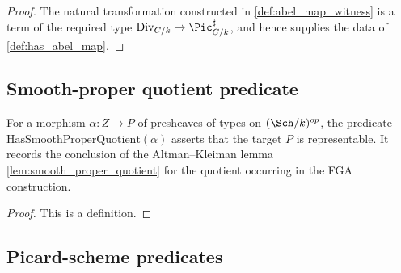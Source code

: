 \begin{proof}
\leanok
  The natural transformation constructed in \cref{def:abel_map_witness} is a
  term of the required type
  \(\mathrm{Div}_{C/k} \to \Pic^\sharp_{C/k}\), and hence supplies the data of
  \cref{def:has_abel_map}.
\end{proof}

\subsection{Smooth-proper quotient predicate}
\label{subsec:fga_pic_quotient_carrier}

\begin{definition}\leanok
  \label{def:has_smooth_proper_quotient}
  For a morphism \(\alpha : Z \to P\) of presheaves of types on
  \((\Sch/k)^{op}\), the predicate \(\mathrm{HasSmoothProperQuotient}(\alpha)\)
  asserts that the target \(P\) is representable. It records the conclusion
  of the Altman--Kleiman lemma \cref{lem:smooth_proper_quotient} for the
  quotient occurring in the FGA construction.
\end{definition}

\begin{proof}\leanok
  This is a definition.
\end{proof}

\subsection{Picard-scheme predicates}
\label{subsec:fga_pic_scheme_carriers}

